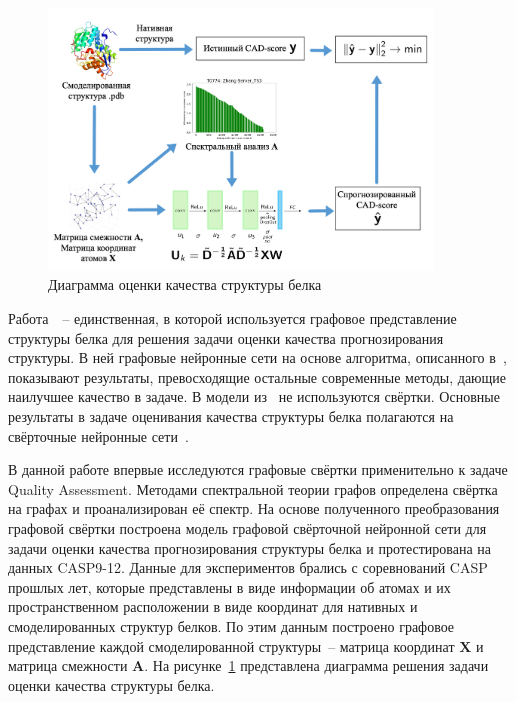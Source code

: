 \documentclass[14pt]{extarticle}
\begin{document}
\begin{figure}[t]
	\centering
	\includegraphics[width=0.91\textwidth]{main_slide.pdf}
	\caption{Диаграмма оценки качества структуры белка}
	\label{fig:experiment}
\end{figure}
Работа~\cite{Baldassarre2019GraphQAPM}~-- единственная, в которой используется графовое представление структуры белка для решения задачи оценки качества прогнозирования структуры. В ней графовые нейронные сети на основе алгоритма, описанного в~\cite{Battaglia2018RelationalIB}, показывают результаты, превосходящие остальные современные методы, дающие наилучшее качество в задаче. В модели из~\cite{Baldassarre2019GraphQAPM} не используются свёртки. Основные результаты в задаче оценивания качества структуры белка полагаются на свёрточные нейронные сети~\cite{10.1093/bioinformatics/btz122}. 

В данной работе впервые исследуются графовые свёртки применительно к задаче Quality Assessment. Методами спектральной теории графов определена свёртка на графах и проанализирован её спектр. На основе полученного преобразования графовой свёртки построена модель графовой свёрточной нейронной сети для задачи оценки качества прогнозирования структуры белка и протестирована на данных CASP9-12. Данные для экспериментов брались с соревнований CASP прошлых лет, которые представлены в виде информации об атомах и их пространственном расположении в виде координат для нативных и смоделированных структур белков. По этим данным построено графовое представление каждой смоделированной структуры~-- матрица координат $\mathbf{X}$ и матрица смежности $\mathbf{A}$. На рисунке~\ref{fig:experiment} представлена диаграмма решения задачи оценки качества структуры белка.
\end{document}
